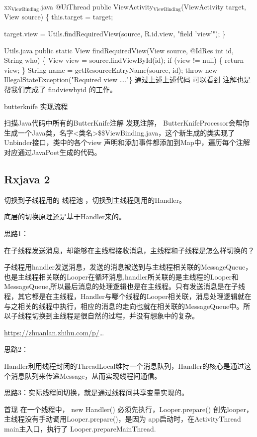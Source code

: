 \documentclass[9pt, b5paper]{article}
\begin{document}
xx$_{\text{ViewBinding}}$.java
@UiThread
  public ViewActivity$_{\text{ViewBinding}}$(ViewActivity target, View source) \{
    this.target = target;

  target.view = Utils.findRequiredView(source, R.id.view, "field 'view'");
\}

Utils.java
public static View findRequiredView(View source, @IdRes int id, String who) \{
    View view = source.findViewById(id);
    if (view != null) \{
      return view;
    \}
    String name = getResourceEntryName(source, id);
    throw new IllegalStateException("Required view \ldots{}."\}
通过上述上述代码 可以看到 注解也是帮我们完成了 findviewbyid 的工作。

butterknife 实现流程

扫描Java代码中所有的ButterKnife注解
发现注解， ButterKnifeProcessor会帮你生成一个Java类，名字<类名>\$\$ViewBinding.java，这个新生成的类实现了Unbinder接口，类中的各个view 声明和添加事件都添加到Map中，遍历每个注解对应通过JavaPoet生成的代码。

\subsection{Rxjava 2}
\label{sec-10-2}
切换到子线程用的 线程池 ，切换到主线程则用的Handler。

底层的切换原理还是基于Handler来的。

思路1：

在子线程发送消息，却能够在主线程接收消息，主线程和子线程是怎么样切换的？

子线程用handler发送消息，发送的消息被送到与主线程相关联的MessageQueue，也是主线程相关联的Looper在循环消息,handler所关联的是主线程的Looper和MessageQueue,所以最后消息的处理逻辑也是在主线程。只有发送消息是在子线程，其它都是在主线程，Handler与哪个线程的Looper相关联，消息处理逻辑就在与之相关的线程中执行，相应的消息的走向也就在相关联的MessageQueue中。所以子线程切换到主线程是很自然的过程，并没有想象中的复杂。

\url{https://zhuanlan.zhihu.com/p/}\ldots{}

思路2：

Handler利用线程封闭的ThreadLocal维持一个消息队列，Handler的核心是通过这个消息队列来传递Message，从而实现线程间通信。

思路3：实际线程间切换，就是通过线程间共享变量实现的。

首现 在一个线程中， new Handler() 必须先执行，Looper.prepare() 创先looper，
主线程没有手动调用Looper.prepare()，是因为 app启动时，在ActivityThread main主入口，执行了 Looper.prepareMainThread.
\end{document}
